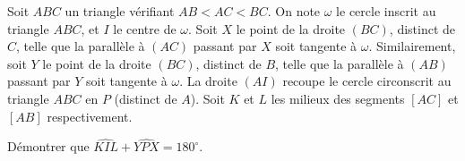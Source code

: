 Soit $ABC$ un triangle vérifiant $AB < AC < BC$. On note $\omega$ le cercle inscrit au triangle $ABC$, et
$I$ le centre de $\omega$. Soit $X$ le point de la droite $(BC)$, distinct de $C$, telle que la parallèle à
$(AC)$ passant par $X$ soit tangente à $\omega$. Similairement, soit $Y$ le point de la droite $(BC)$,
distinct de $B$, telle que la parallèle à $(AB)$ passant par $Y$ soit tangente à $\omega$. La droite $(AI)$
recoupe le cercle circonscrit au triangle $ABC$ en $P$ (distinct de $A$). Soit $K$ et $L$ les milieux des
segments $[AC]$ et $[AB]$ respectivement.

Démontrer que $\widehat{KIL} + \widehat{YPX} = 180^\circ$.

